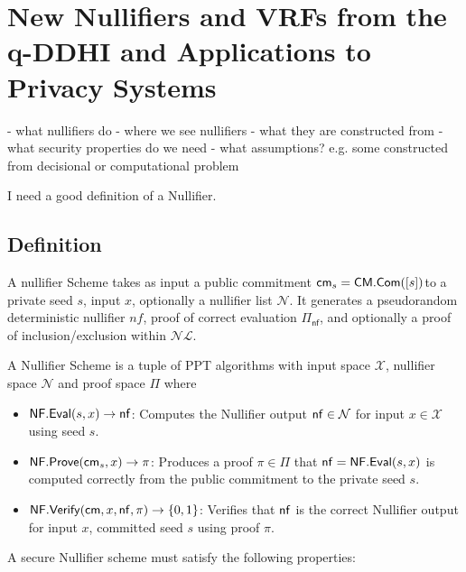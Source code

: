 \chapter{New Nullifiers and VRFs from the q-DDHI and Applications to Privacy Systems}\label{chap4}

- what nullifiers do
- where we see nullifiers
- what they are constructed from
- what security properties do we need
- what assumptions? e.g. some constructed from decisional or computational problem




I need a good definition of a Nullifier.

\section{Definition}
A nullifier Scheme takes as input a public commitment $\mathsf{cm}_s = \mathsf{CM.Com}([s])$to a private seed $s$, input $x$, optionally a nullifier list $\mathcal{N}$. It generates a pseudorandom deterministic nullifier $nf$, proof of correct evaluation $\Pi_{\mathsf{nf}}$, and optionally a proof of inclusion/exclusion within $\mathcal{NL}$.

\begin{definition}[Nullifier]
A Nullifier Scheme is a tuple of PPT algorithms with input space $\mathcal{X}$, nullifier space $\mathcal{N}$ and proof space $\Pi$ where
\begin{itemize}
    \item $\mathsf{NF.Eval}(s,x) \to \mathsf{nf}$: Computes the Nullifier output $\mathsf{nf} \in \mathcal{N}$ for input $x \in \mathcal{X}$ using seed $s$.
    \item $\mathsf{NF.Prove}(\mathsf{cm}_s, x) \to \pi$: Produces a proof $\pi \in \Pi$ that $\mathsf{nf} = \mathsf{NF.Eval}(s,x)$ is computed correctly from the public commitment to the private seed $s$.
    \item $\mathsf{NF.Verify}(\mathsf{cm},x,\mathsf{nf},\pi) \to \{0,1\}$: Verifies that $\mathsf{nf}$ is the correct Nullifier output for input $x$, committed seed $s$ using proof $\pi$.
\end{itemize}
    
\end{definition}

A secure Nullifier scheme must satisfy the following properties:

